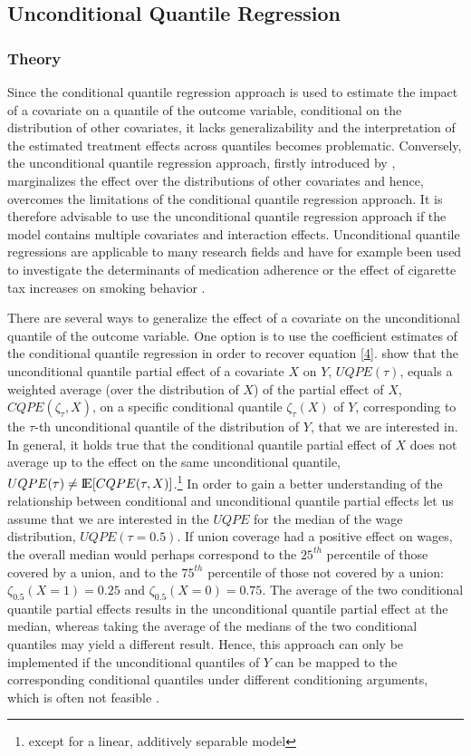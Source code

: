 \subsection{Unconditional Quantile Regression}
\subsubsection*{Theory}
Since the conditional quantile regression approach is used to estimate the impact of a covariate on a quantile of the outcome variable, conditional on the distribution of other covariates, it lacks generalizability and the interpretation of the estimated treatment effects across quantiles becomes problematic.
Conversely, the unconditional quantile regression approach, firstly introduced by \cite{Firpo&Fortin&Lemieux:09}, marginalizes the effect over the distributions of other covariates and hence, overcomes the limitations of the conditional quantile regression approach. It is therefore advisable to use the unconditional quantile regression approach if the model contains multiple covariates and interaction effects. Unconditional quantile regressions are applicable to many research fields and have for example been used to investigate the determinants of medication adherence \citep{Borah&Basu:2013} or the effect of cigarette tax increases on smoking behavior \citep{Maclean&Marti&Webber:2014}.

There are several ways to generalize the effect of a covariate on the unconditional quantile of the outcome variable. One option is to use the coefficient estimates of the conditional quantile regression in order to recover equation \ref{4}. \cite{Firpo&Fortin&Lemieux:09} show that the unconditional quantile partial effect of a covariate $X$ on $Y$, $UQPE(\tau)$, equals a weighted average (over the distribution of $X$) of the partial effect of $X$, $CQPE(\zeta_{\tau}, X)$, on a specific conditional quantile $\zeta_{\tau}(X)$ of $Y$, corresponding to the $\tau$-th unconditional quantile of the distribution of $Y$, that we are interested in. In general, it holds true that the conditional quantile partial effect of $X$ does not average up to the effect on the same unconditional quantile, $UQPE(\tau) \neq \mbox{I\negthinspace E}[CQPE(\tau, X)]$.\footnote{ except for a linear, additively separable model} In order to gain a better understanding of the relationship between conditional and unconditional quantile partial effects let us assume that we are interested in the $UQPE$ for the median of the wage distribution, $UQPE(\tau = 0.5)$. If union coverage had a positive effect on wages, the overall median would perhaps correspond to the $25^{th}$ percentile of those covered by a union, and to the $75^{th}$ percentile of those not covered by a union: $\zeta_{0.5}(X=1)=0.25$ and $\zeta_{0.5}(X=0)=0.75$. The average of the two conditional quantile partial effects results in the unconditional quantile partial effect at the median, whereas taking the average of the medians of the two conditional quantiles may yield a different result. Hence, this approach can only be implemented if the unconditional quantiles of $Y$ can be mapped to the corresponding conditional quantiles under different conditioning arguments, which is often not feasible \citep{Borah&Basu:2013}.

